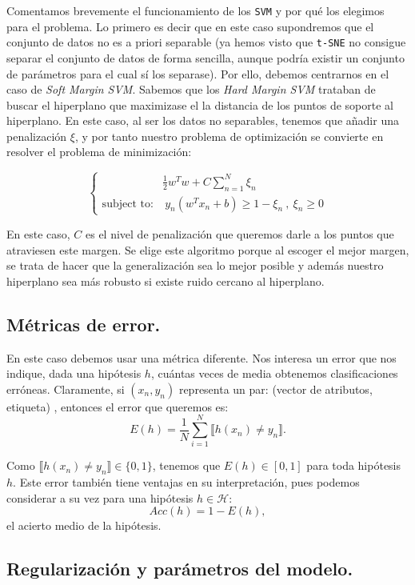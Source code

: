 \documentclass[a4paper, 20pt]{article}
\begin{document}
Comentamos brevemente el funcionamiento de los \lstinline{SVM} y por qué los elegimos para el problema. Lo primero es decir que en este caso supondremos que el conjunto de datos no es a priori separable (ya hemos visto que \lstinline{t-SNE} no consigue separar el conjunto de datos de forma sencilla, aunque podría existir un conjunto de parámetros para el cual sí los separase). Por ello, debemos centrarnos en el caso de \emph{Soft Margin SVM}. Sabemos que los \emph{Hard Margin SVM} trataban de buscar el hiperplano que maximizase el la distancia de los puntos de soporte al hiperplano. En este caso, al ser los datos no separables, tenemos que añadir una penalización $\xi$, y por tanto nuestro problema de optimización se convierte en resolver el problema de minimización:

\[
\begin{cases}
  & \frac{1}{2}w^T w + C \sum_{n = 1}^N \xi_n \\
  \text{subject to:} & \ y_n(w^T x_n + b) \geq 1- \xi_n \ , \ \xi_n \geq 0
\end{cases}
\]

En este caso, $C$ es el nivel de penalización que queremos darle a los puntos que atraviesen este margen. Se elige este algoritmo porque al escoger el mejor margen, se trata de hacer que la generalización sea lo mejor posible y además nuestro hiperplano sea más robusto si existe ruido cercano al hiperplano.




\subsection{Métricas de error.}

En este caso debemos usar una métrica diferente. Nos interesa un error que nos indique, dada una hipótesis $h$, cuántas veces de media obtenemos clasificaciones erróneas. Claramente, si $(x_n,y_n)$ representa un par: (vector de atributos, etiqueta) , entonces el error que queremos es:
$$
E(h) = \frac{1}{N} \sum_{i = 1}^N \llbracket h(x_n) \neq y_n \rrbracket.
$$

Como $\llbracket h(x_n) \neq y_n \rrbracket \in \{0,1\}$, tenemos que $E(h) \in [0,1]$ para toda hipótesis $h$. Este error también tiene ventajas en su interpretación, pues podemos considerar a su vez para una hipótesis $h \in \mathcal H$:
$$
Acc(h) = 1 - E(h),
$$
el acierto medio de la hipótesis.

\subsection{Regularización y parámetros del modelo.}
\end{document}
